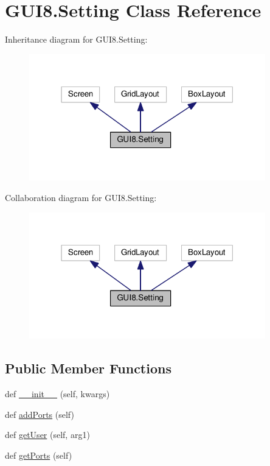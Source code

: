 \hypertarget{classGUI8_1_1Setting}{}\section{G\+U\+I8.\+Setting Class Reference}
\label{classGUI8_1_1Setting}


Inheritance diagram for G\+U\+I8.\+Setting\+:
\nopagebreak
\begin{figure}[H]
\begin{center}
\leavevmode
\includegraphics[width=291pt]{classGUI8_1_1Setting__inherit__graph}
\end{center}
\end{figure}


Collaboration diagram for G\+U\+I8.\+Setting\+:
\nopagebreak
\begin{figure}[H]
\begin{center}
\leavevmode
\includegraphics[width=291pt]{classGUI8_1_1Setting__coll__graph}
\end{center}
\end{figure}
\subsection*{Public Member Functions}
\begin{DoxyCompactItemize}
\item 
def \hyperlink{classGUI8_1_1Setting_a777bd294027ee83a8e577db4c4653e36}{\+\_\+\+\_\+init\+\_\+\+\_\+} (self, kwargs)
\item 
def \hyperlink{classGUI8_1_1Setting_ae85ded752f2e724dc327e515bad65b24}{add\+Ports} (self)
\item 
def \hyperlink{classGUI8_1_1Setting_abf9d205f088d416b5e1f64e73564c223}{get\+User} (self, arg1)
\item 
def \hyperlink{classGUI8_1_1Setting_ab300a0b2c2439516a9aa85e180f280f3}{get\+Ports} (self)
\end{DoxyCompactItemize}
